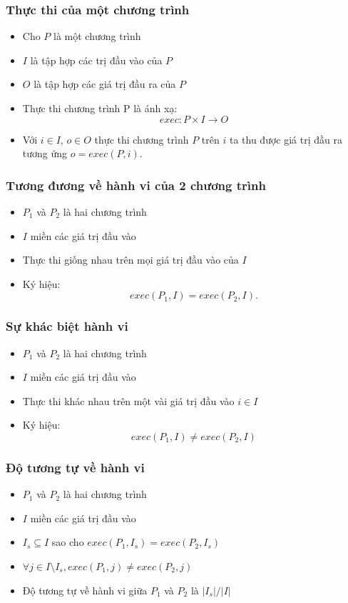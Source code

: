 \documentclass{beamer}
\begin{document}
\begin{frame}
  \frametitle{Thực thi của một chương trình}
  \begin{itemize}
  	\item Cho $P$ là một chương trình
  	\item $I$ là tập hợp các trị đầu vào của $P$
  	\item $O$ là tập hợp các giá trị đầu ra của $P$
  	\item Thực thi chương trình	P là ánh xạ: 
  	\[exec: P \times I \rightarrow O\]
  	\item Với $i \in I$, $o \in O$ thực thi chương trình $P$ trên
  	$i$ ta thu được giá trị đầu ra tương ứng $o = exec(P, i)$.
  \end{itemize}  
\end{frame}


\begin{frame}
  \frametitle{Tương đương về hành vi của 2 chương trình}
  \begin{itemize}
  	\item $P_{1}$ và $P_{2}$ là hai chương trình 
  	\item $I$ miền các giá trị đầu vào
  	\item Thực thi giống nhau trên mọi giá trị đầu vào của $I$ 
  	\item Ký hiệu: \[exec(P_{1}, I) = exec(P_{2}, I).\]
  \end{itemize}
 
\end{frame}


\begin{frame}
  \frametitle{Sự khác biệt hành vi}
  \begin{itemize}
  	\item $P_{1}$ và $P_{2}$ là hai chương trình
  	\item $I$ miền các giá trị đầu vào 
  	\item Thực thi khác nhau trên một vài giá
  	trị đầu vào $i \in I$
  	\item Ký hiệu: \[exec(P_{1}, I) \neq exec(P_{2}, I)\]
  \end{itemize}

\end{frame}


\begin{frame}
  \frametitle{Độ tương tự về hành vi}
  \begin{itemize}
  	\item $P_{1}$ và $P_{2}$ là hai chương trình
  	\item $I$ miền các giá trị đầu vào 
  	\item $I_{s} \subseteq I$ sao cho
  	$exec(P_{1}, I_{s}) = exec(P_{2}, I_{s})$
  	\item $\forall j \in I \setminus I_{s}, exec(P_{1}, j) \neq exec(P_{2},
  	j)$
  	\item Độ tương tự về hành vi giữa $P_1$ và $P_2$ là $|I_s|/|I|$
  \end{itemize}
\end{frame}
\end{document}
